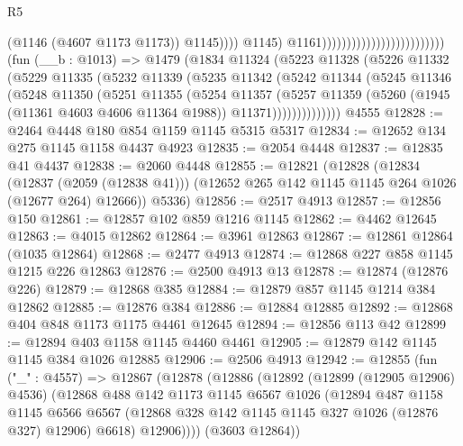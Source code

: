 \begin{lexlean}{R5}
\begin{coremodule}
                                                                (@1146 (@4607 @1173 @1173))
                                                                @1145))))
                                                        @1145)
                                                      @1161)))))))))))))))))))))))))
    (fun (__b : @1013) =>
    @1479
      (@1834
        @11324
        (@5223
          @11328
          (@5226
            @11332
            (@5229
              @11335
              (@5232
                @11339
                (@5235
                  @11342
                  (@5242
                    @11344
                    (@5245
                      @11346
                      (@5248
                        @11350
                        (@5251
                          @11355
                          (@5254
                            @11357
                            (@5257
                              @11359
                              (@5260 (@1945 (@11361 @4603 @4606 @11364 @1988)) @11371))))))))))))))
    @4555
@12828 := @2464 @4448 @180 @854 @1159 @1145 @5315 @5317
@12834 := @12652 @134 @275 @1145 @1158 @4437 @4923
@12835 := @2054 @4448
@12837 := @12835 @41 @4437
@12838 := @2060 @4448
@12855 := @12821
    (@12828
      (@12834
        (@12837 (@2059 (@12838 @41)))
        (@12652 @265 @142 @1145 @1145 @264 @1026 (@12677 @264) @12666))
      @5336)
@12856 := @2517 @4913
@12857 := @12856 @150
@12861 := @12857 @102 @859 @1216 @1145
@12862 := @4462 @12645
@12863 := @4015 @12862
@12864 := @3961 @12863
@12867 := @12861 @12864 (@1035 @12864)
@12868 := @2477 @4913
@12874 := @12868 @227 @858 @1145 @1215 @226 @12863
@12876 := @2500 @4913 @13
@12878 := @12874 (@12876 @226)
@12879 := @12868 @385
@12884 := @12879 @857 @1145 @1214 @384 @12862
@12885 := @12876 @384
@12886 := @12884 @12885
@12892 := @12868 @404 @848 @1173 @1175 @4461 @12645
@12894 := @12856 @113 @42
@12899 := @12894 @403 @1158 @1145 @4460 @4461
@12905 := @12879 @142 @1145 @1145 @384 @1026 @12885
@12906 := @2506 @4913
@12942 := @12855
    (fun ("_" : @4557) =>
    @12867
      (@12878
        (@12886
          (@12892
            (@12899 (@12905 @12906) @4536)
            (@12868
              @488
              @142
              @1173
              @1145
              @6567
              @1026
              (@12894
                @487
                @1158
                @1145
                @6566
                @6567
                (@12868 @328 @142 @1145 @1145 @327 @1026 (@12876 @327) @12906)
                @6618)
              @12906))))
      (@3603 @12864))

\end{coremodule}
\end{lexlean}
